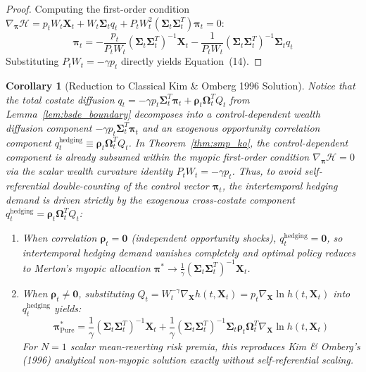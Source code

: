 \documentclass[11pt,a4paper]{article}
\theoremstyle{plain}
\newtheorem{corollary}[theorem]{Corollary}
\theoremstyle{definition}
\theoremstyle{remark}
\begin{document}
\begin{proof}
Computing the first-order condition $\nabla_{\mathbf{\pi}} \mathcal{H} = p_t W_t \mathbf{X}_t + W_t \mathbf{\Sigma}_t q_t + P_t W_t^2 (\mathbf{\Sigma}_t \mathbf{\Sigma}_t^T) \mathbf{\pi}_t = 0$:
\begin{equation}
    \mathbf{\pi}_t = -\frac{p_t}{P_t W_t} (\mathbf{\Sigma}_t \mathbf{\Sigma}_t^T)^{-1} \mathbf{X}_t - \frac{1}{P_t W_t} (\mathbf{\Sigma}_t \mathbf{\Sigma}_t^T)^{-1} \mathbf{\Sigma}_t q_t
\end{equation}
Substituting $P_t W_t = -\gamma p_t$ directly yields Equation~(14).
\end{proof}

\begin{corollary}[Reduction to Classical Kim \& Omberg 1996 Solution]
\label{cor:ko_reduction}
Notice that the total costate diffusion $q_t = -\gamma p_t \mathbf{\Sigma}_t^T \mathbf{\pi}_t + \mathbf{\rho}_t \mathbf{\Omega}_t^T Q_t$ from Lemma~\ref{lem:bsde_boundary} decomposes into a control-dependent wealth diffusion component $-\gamma p_t \mathbf{\Sigma}_t^T \mathbf{\pi}_t$ and an exogenous opportunity correlation component $q_t^{\text{hedging}} \equiv \mathbf{\rho}_t \mathbf{\Omega}_t^T Q_t$. In Theorem~\ref{thm:smp_ko}, the control-dependent component is already subsumed within the myopic first-order condition $\nabla_{\mathbf{\pi}} \mathcal{H} = 0$ via the scalar wealth curvature identity $P_t W_t = -\gamma p_t$. Thus, to avoid self-referential double-counting of the control vector $\mathbf{\pi}_t$, the intertemporal hedging demand is driven strictly by the exogenous cross-costate component $q_t^{\text{hedging}} = \mathbf{\rho}_t \mathbf{\Omega}_t^T Q_t$:
\begin{enumerate}
    \item When correlation $\mathbf{\rho}_t = \mathbf{0}$ (independent opportunity shocks), $q_t^{\text{hedging}} = \mathbf{0}$, so intertemporal hedging demand vanishes completely and optimal policy reduces to Merton's myopic allocation $\mathbf{\pi}^* \to \frac{1}{\gamma}(\mathbf{\Sigma}_t \mathbf{\Sigma}_t^T)^{-1}\mathbf{X}_t$.
    \item When $\mathbf{\rho}_t \neq \mathbf{0}$, substituting $Q_t = W_t^{-\gamma} \nabla_{\mathbf{X}} h(t, \mathbf{X}_t) = p_t \nabla_{\mathbf{X}} \ln h(t, \mathbf{X}_t)$ into $q_t^{\text{hedging}}$ yields:
    \begin{equation}
        \mathbf{\pi}_{\text{Pure}}^* = \frac{1}{\gamma} (\mathbf{\Sigma}_t \mathbf{\Sigma}_t^T)^{-1} \mathbf{X}_t + \frac{1}{\gamma} (\mathbf{\Sigma}_t \mathbf{\Sigma}_t^T)^{-1} \mathbf{\Sigma}_t \mathbf{\rho}_t \mathbf{\Omega}_t^T \nabla_{\mathbf{X}} \ln h(t, \mathbf{X}_t)
    \end{equation}
    For $N=1$ scalar mean-reverting risk premia, this reproduces Kim \& Omberg's (1996) analytical non-myopic solution exactly without self-referential scaling.
\end{enumerate}
\end{corollary}
\end{document}
